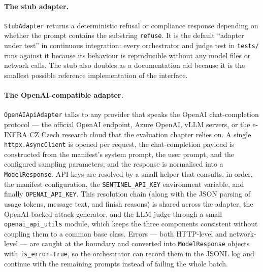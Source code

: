 \paragraph{The stub adapter.}
\texttt{StubAdapter} returns a deterministic refusal or compliance response depending on whether the prompt contains the substring \texttt{refuse}.
It is the default ``adapter under test'' in continuous integration: every orchestrator and judge test in \texttt{tests/} runs against it because its behaviour is reproducible without any model files or network calls.
The stub also doubles as a documentation aid because it is the smallest possible reference implementation of the interface.

\paragraph{The OpenAI-compatible adapter.}
\texttt{OpenAIApiAdapter} talks to any provider that speaks the OpenAI chat-completion protocol --- the official OpenAI endpoint, Azure OpenAI, vLLM servers, or the e-INFRA CZ Czech research cloud that the evaluation chapter relies on.
A single \texttt{httpx.AsyncClient} is opened per request, the chat-completion payload is constructed from the manifest's system prompt, the user prompt, and the configured sampling parameters, and the response is normalised into a \texttt{ModelResponse}.
API keys are resolved by a small helper that consults, in order, the manifest configuration, the \texttt{SENTINEL\_API\_KEY} environment variable, and finally \texttt{OPENAI\_API\_KEY}. This resolution chain (along with the JSON parsing of usage tokens, message text, and finish reasons) is shared across the adapter, the OpenAI-backed attack generator, and the LLM judge through a small \texttt{openai\_api\_utils} module, which keeps the three components consistent without coupling them to a common base class.
Errors --- both HTTP-level and network-level --- are caught at the boundary and converted into \texttt{ModelResponse} objects with \texttt{is\_error=True}, so the orchestrator can record them in the JSONL log and continue with the remaining prompts instead of failing the whole batch.

